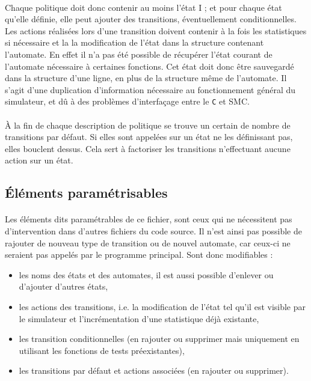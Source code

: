 \paragraph{}
Chaque politique doit donc contenir au moins l'état I ; et pour chaque état qu'elle définie, elle peut ajouter des transitions, éventuellement conditionnelles. Les actions réalisées lors d'une transition doivent contenir à la fois les statistiques si nécessaire et la la modification de l'état dans la structure contenant l'automate. En effet il n'a pas été possible de récupérer l'état courant de l'automate nécessaire à certaines fonctions. Cet état doit donc être sauvegardé dans la structure d'une ligne, en plus de la structure même de l'automate. Il s'agit d'une duplication d'information nécessaire au fonctionnement général du simulateur, et dû à des problèmes d'interfaçage entre le \texttt{C} et \textsf{SMC}.

\paragraph{}
\`A la fin de chaque description de politique se trouve un certain de nombre de transitions par défaut. Si elles sont appelées sur un état ne les définissant pas, elles bouclent dessus. Cela sert à factoriser les transitions n'effectuant aucune action sur un état.

\subsection{\'Eléments paramétrisables}

\paragraph{}
Les éléments dits paramétrables de ce fichier, sont ceux qui ne nécessitent pas d'intervention dans d'autres fichiers du code source. Il n'est ainsi pas possible de rajouter de nouveau type de transition ou de nouvel automate, car ceux-ci ne seraient pas appelés par le programme principal. Sont donc modifiables : \\
\begin{itemize}
\item{les noms des états et des automates, il est aussi possible d'enlever ou d'ajouter d'autres états,}
\item{les actions des transitions, i.e. la modification de l'état tel qu'il est visible par le simulateur et l'incrémentation d'une statistique déjà existante,}
\item{les transition conditionnelles (en rajouter ou supprimer mais uniquement en utilisant les fonctions de tests préexistantes),}
\item{les transitions par défaut et actions associées (en rajouter ou supprimer).}
\end{itemize}

